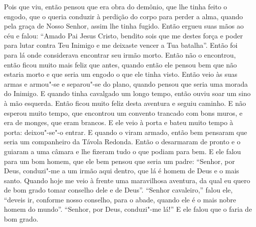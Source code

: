 Pois que viu, então pensou que era obra do demônio, que lhe tinha feito o
engodo, que o queria conduzir à perdição do corpo para perder a alma, quando
pela graça de Nosso Senhor, assim lhe tinha fugido. Então ergueu suas mãos ao
céu e falou: “Amado Pai Jesus Cristo, bendito sois que me destes força e poder
para lutar contra Teu Inimigo e me deixaste vencer a Tua batalha”. Então foi
para lá onde considerava encontrar seu irmão morto. Então não o encontrou,
então ficou muito mais feliz que antes, quando então ele pensou bem que não
estaria morto e que seria um engodo o que ele tinha visto. Então veio às suas
armas e armou"-se e separou"-se do plano, quando pensou que seria uma morada do
Inimigo. E quando tinha cavalgado um longo tempo, então ouviu soar um sino à
mão esquerda. Então ficou muito feliz desta aventura e seguiu caminho. E não
esperou muito tempo, que encontrou um convento trancado com bons muros, e era
de monges, que eram brancos. E ele veio à porta e bateu muito tempo à porta:
deixou"-se"-o entrar. E quando o viram armado, então bem pensaram que seria um
companheiro da Távola Redonda. Então o desarmaram de pronto e o guiaram a uma
câmara e lhe fizeram tudo o que podiam para bem. E ele falou para um bom homem,
que ele bem pensou que seria um padre: “Senhor, por Deus, conduzi"-me a um irmão
aqui dentro, que lá é homem de Deus e o mais santo. Quando hoje me veio à
frente uma maravilhosa aventura, da qual eu quero de bom grado tomar conselho
dele e de Deus”. “Senhor cavaleiro,” falou ele, “deveis ir, conforme nosso
conselho, para o abade, quando ele é o mais nobre homem do mundo”. “Senhor, por
Deus, conduzi"-me lá!” E ele falou que o faria de bom grado.

